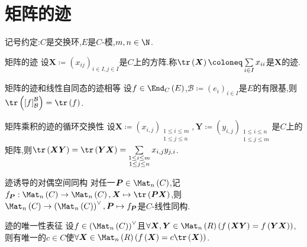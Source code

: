 \section{矩阵的迹}

记号约定:$C$是交换环,$E$是$C$-模,$m,n\in\N$.

\begin{definition}{矩阵的迹}{}
	设$\boldsymbol{X}\coloneq\left(x_{ij}\right)_{i\in I,j\in I}$是$C$上的方阵.称$\tr\left(\boldsymbol{X}\right)\coloneq\sum\limits_{i\in I}x_{ii}$是$\boldsymbol{X}$的迹.
\end{definition}

\begin{proposition}{矩阵的迹和线性自同态的迹相等}{}
	设$f\in\End_{C}\left(E\right)$,$\mathcal{B}\coloneq\left(e_{i}\right)_{i\in I}$是$E$的有限基,则$\tr\left(\left[f\right]_{\mathcal{B}}^{\mathcal{B}}\right)=\tr\left(f\right)$.
\end{proposition}

\begin{proposition}{矩阵乘积的迹的循环交换性}{}
	设$\boldsymbol{X}\coloneq\left(x_{i,j}\right)_{\substack{1\leqslant i\leqslant m\\1\leqslant j\leqslant n}},\boldsymbol{Y}\coloneq\left(y_{i,j}\right)_{\substack{1\leqslant i\leqslant n\\1\leqslant j\leqslant m}}$是$C$上的矩阵,则$\tr\left(\boldsymbol{X}\boldsymbol{Y}\right)=\tr\left(\boldsymbol{Y}\boldsymbol{X}\right)=\sum\limits_{\substack{1\leq i\leq m\\1\leq j\leq n}}x_{i,j}y_{j,i}$.
\end{proposition}

\begin{proposition}{迹诱导的对偶空间同构}{}
	对任一$\boldsymbol{P}\in\Mat_{n}\left(C\right)$,记$f_{\boldsymbol{P}}:\Mat_{n}\left(C\right)\to\Mat_{n}\left(C\right),\boldsymbol{X}\mapsto\tr\left(\boldsymbol{P}\boldsymbol{X}\right)$,则$\Mat_{n}\left(C\right)\to\left(\Mat_{n}\left(C\right)\right)^{\vee},\boldsymbol{P}\mapsto f_{\boldsymbol{P}}$是$C$-线性同构.
\end{proposition}

\begin{proposition}{迹的唯一性表征}{}
	设$f\in\left(\Mat_{n}\left(C\right)\right)^{\vee}$且$\forall\boldsymbol{X},\boldsymbol{Y}\in\Mat_{n}\left(R\right)\left(f\left(\boldsymbol{X}\boldsymbol{Y}\right)=f\left(\boldsymbol{Y}\boldsymbol{X}\right)\right)$,则有唯一的$c\in C$使$\forall\boldsymbol{X}\in\Mat_{n}\left(R\right)\left(f\left(\boldsymbol{X}\right)=c\tr\left(\boldsymbol{X}\right)\right)$.
\end{proposition}
